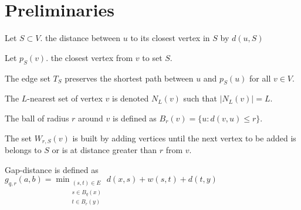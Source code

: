\section{Preliminaries}

\begin{definition}
Let $S \subset V$. the distance between $u$ to its closest vertex in $S$ by $d(u,S)$
\end{definition}

\begin{definition}
Let $p_S(v)$. the closest vertex from $v$ to set $S$.
\end{definition}


\begin{definition}
The edge set $T_S $ preserves the shortest path between $u$ and $p_S(u)$ for all $v \in V$.
\end{definition}

\begin{definition}
The $L$-nearest set of vertex $v$ is denoted $N_L(v)$ such that $|N_L(v)|=L$.
\end{definition}


\begin{definition}
The ball of radius $r$ around $v$ is defined as $B_r(v)=\{u: d(v,u)\leq r\}$.
\end{definition}

\begin{definition}
The set $W_{r,S}(v)$ is built by adding vertices until the next vertex to be added is belongs to $S$ or is at distance greater than $r$ from $v$.
\end{definition}

\begin{definition}
Gap-distance is defined as $g_{q,r}(a,b)=\min_{\substack{(s,t) \in E  \\ s \in B_{q}(x) \\ t \in B_{r}(y) }} d(x,s)+w(s,t)+d(t,y)$
\end{definition}


